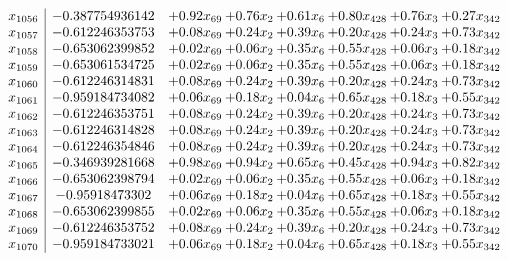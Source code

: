 \documentclass[8pt]{article}
\begin{document}
\[\begin{array}{c| c c@{\hskip 2pt} c@{\hskip 2pt} c@{\hskip 2pt} c@{\hskip 2pt} c@{\hskip 2pt} c@{\hskip 2pt} }
 x_{1056}   &  -0.387754936142 & +  0.92 x_{69} & +  0.76 x_{2} & +  0.61 x_{6} & +  0.80 x_{428} & +  0.76 x_{3} & +  0.27 x_{342}\\
 x_{1057}   &  -0.612246353753 & +  0.08 x_{69} & +  0.24 x_{2} & +  0.39 x_{6} & +  0.20 x_{428} & +  0.24 x_{3} & +  0.73 x_{342}\\
 x_{1058}   &  -0.653062399852 & +  0.02 x_{69} & +  0.06 x_{2} & +  0.35 x_{6} & +  0.55 x_{428} & +  0.06 x_{3} & +  0.18 x_{342}\\
 x_{1059}   &  -0.653061534725 & +  0.02 x_{69} & +  0.06 x_{2} & +  0.35 x_{6} & +  0.55 x_{428} & +  0.06 x_{3} & +  0.18 x_{342}\\
 x_{1060}   &  -0.612246314831 & +  0.08 x_{69} & +  0.24 x_{2} & +  0.39 x_{6} & +  0.20 x_{428} & +  0.24 x_{3} & +  0.73 x_{342}\\
 x_{1061}   &  -0.959184734082 & +  0.06 x_{69} & +  0.18 x_{2} & +  0.04 x_{6} & +  0.65 x_{428} & +  0.18 x_{3} & +  0.55 x_{342}\\
 x_{1062}   &  -0.612246353751 & +  0.08 x_{69} & +  0.24 x_{2} & +  0.39 x_{6} & +  0.20 x_{428} & +  0.24 x_{3} & +  0.73 x_{342}\\
 x_{1063}   &  -0.612246314828 & +  0.08 x_{69} & +  0.24 x_{2} & +  0.39 x_{6} & +  0.20 x_{428} & +  0.24 x_{3} & +  0.73 x_{342}\\
 x_{1064}   &  -0.612246354846 & +  0.08 x_{69} & +  0.24 x_{2} & +  0.39 x_{6} & +  0.20 x_{428} & +  0.24 x_{3} & +  0.73 x_{342}\\
 x_{1065}   &  -0.346939281668 & +  0.98 x_{69} & +  0.94 x_{2} & +  0.65 x_{6} & +  0.45 x_{428} & +  0.94 x_{3} & +  0.82 x_{342}\\
 x_{1066}   &  -0.653062398794 & +  0.02 x_{69} & +  0.06 x_{2} & +  0.35 x_{6} & +  0.55 x_{428} & +  0.06 x_{3} & +  0.18 x_{342}\\
 x_{1067}   &  -0.95918473302 & +  0.06 x_{69} & +  0.18 x_{2} & +  0.04 x_{6} & +  0.65 x_{428} & +  0.18 x_{3} & +  0.55 x_{342}\\
 x_{1068}   &  -0.653062399855 & +  0.02 x_{69} & +  0.06 x_{2} & +  0.35 x_{6} & +  0.55 x_{428} & +  0.06 x_{3} & +  0.18 x_{342}\\
 x_{1069}   &  -0.612246353752 & +  0.08 x_{69} & +  0.24 x_{2} & +  0.39 x_{6} & +  0.20 x_{428} & +  0.24 x_{3} & +  0.73 x_{342}\\
 x_{1070}   &  -0.959184733021 & +  0.06 x_{69} & +  0.18 x_{2} & +  0.04 x_{6} & +  0.65 x_{428} & +  0.18 x_{3} & +  0.55 x_{342}\\

\end{array}\]
\end{document}
